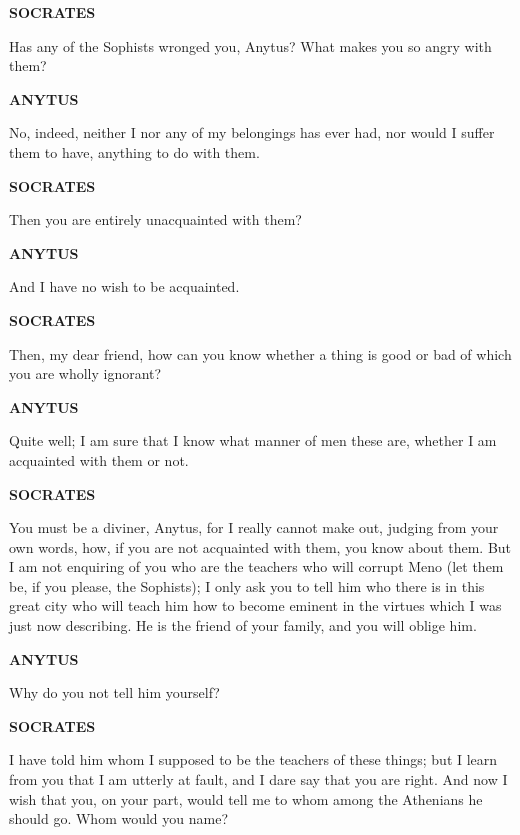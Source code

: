 \documentclass[11pt,letter]{article}
\begin{document}
\par \textbf{SOCRATES}
\par   Has any of the Sophists wronged you, Anytus? What makes you so angry with them?

\par \textbf{ANYTUS}
\par   No, indeed, neither I nor any of my belongings has ever had, nor would I suffer them to have, anything to do with them.

\par \textbf{SOCRATES}
\par   Then you are entirely unacquainted with them?

\par \textbf{ANYTUS}
\par   And I have no wish to be acquainted.

\par \textbf{SOCRATES}
\par   Then, my dear friend, how can you know whether a thing is good or bad of which you are wholly ignorant?

\par \textbf{ANYTUS}
\par   Quite well; I am sure that I know what manner of men these are, whether I am acquainted with them or not.

\par \textbf{SOCRATES}
\par   You must be a diviner, Anytus, for I really cannot make out, judging from your own words, how, if you are not acquainted with them, you know about them. But I am not enquiring of you who are the teachers who will corrupt Meno (let them be, if you please, the Sophists); I only ask you to tell him who there is in this great city who will teach him how to become eminent in the virtues which I was just now describing. He is the friend of your family, and you will oblige him.

\par \textbf{ANYTUS}
\par   Why do you not tell him yourself?

\par \textbf{SOCRATES}
\par   I have told him whom I supposed to be the teachers of these things; but I learn from you that I am utterly at fault, and I dare say that you are right. And now I wish that you, on your part, would tell me to whom among the Athenians he should go. Whom would you name?
\end{document}
